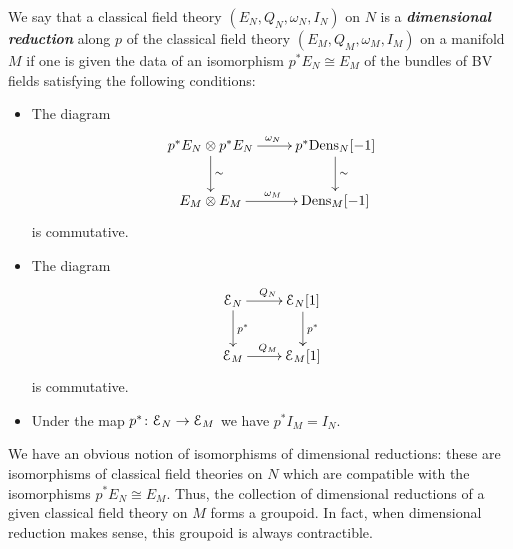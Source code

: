 \documentclass[10pt, oneside]{article}
\newcommand{\Dens}{\mathrm{Dens}}
\newcommand{\defterm}[1]{\textbf{\emph{#1}}}
\begin{document}
\begin{definition}
We say that a classical field theory $(E_N, Q_N, \omega_N, I_N)$ on $N$ is a \defterm{dimensional reduction} along $p$ of the classical field theory $(E_M, Q_M, \omega_M, I_M)$ on a manifold $M$ if one is given the data of an isomorphism $p^* E_N\cong E_M$ of the bundles of BV fields satisfying the following conditions:
\begin{itemize}
\item The diagram
\[
\xymatrix{
p^* E_N\otimes p^* E_N \ar^{\omega_N}[r] \ar^{\sim}[d] & p^*\Dens_N[-1] \ar^{\sim}[d] \\
E_M\otimes E_M \ar^{\omega_M}[r] & \Dens_M[-1]
}
\]
is commutative.

\item The diagram
\[
\xymatrix{
\cE_N \ar^{Q_N}[r] \ar^{p^*}[d] & \cE_N[1] \ar^{p^*}[d] \\
\cE_M \ar^{Q_M}[r] & \cE_M[1]
}
\]
is commutative.

\item Under the map $p^*\colon \mathcal E_N\rightarrow \mathcal E_M$ we have $p^* I_M = I_N$.
\end{itemize}
\end{definition}

We have an obvious notion of isomorphisms of dimensional reductions: these are isomorphisms of classical field theories on $N$ which are compatible with the isomorphisms $p^* E_N\cong E_M$. Thus, the collection of dimensional reductions of a given classical field theory on $M$ forms a groupoid.  In fact, when dimensional reduction makes sense, this groupoid is always contractible.
\end{document}
